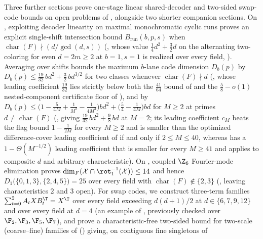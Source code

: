 Three further sections prove one-stage linear shared-decoder and two-sided swap-code bounds on open
problems of \cite{SeventeenthPaper2026}, alongside two shorter companion sections. On
\cite[Problem~9.1(a)]{SeventeenthPaper2026}, exploiting decoder linearity on maximal monochromatic
cyclic runs proves an explicit single-shift intersection bound $B_{\mathrm{run}}(b,p,s)$ when
$\operatorname{char}(F) \nmid (d/\gcd(d,s))$ (, whose value
$\frac{1}{4}d^2 + \frac{3}{2}d$ on the alternating two-coloring for even $d = 2m \ge 2$ at
$b = 1, s = 1$ is realized over every field, ). Averaging over shifts bounds
the maximum $b$-lane code dimension $D_b(p)$ by
$D_b(p) \le \frac{19}{32}\,bd^2 + \frac{3}{2}\,bd^{3/2}$ for two classes whenever
$\operatorname{char}(F) \nmid d$ (, whose leading coefficient $\frac{19}{32}$
lies strictly below both the $\frac{41}{64}$ bound of \cite[Theorem~3.4]{SharedDecoders2026} and the
$\frac{5}{8} - o(1)$ nested-component certificate floor of \cite[Theorem~C.6]{SharedDecoders2026}),
and by
$D_b(p) \le \bigl(1 - \frac{5}{4M} + \frac{1}{M^2} - \frac{1}{4M^3}\bigr)bd^2 +
\bigl(\frac{5}{4} - \frac{1}{4M}\bigr)bd$ for $M \ge 2$ at primes $d \ne \operatorname{char}(F)$
(, giving $\frac{19}{32}\,bd^2 + \frac{9}{8}\,bd$ at $M = 2$; its leading
coefficient $c_M$ beats the flag bound $1 - \frac{1}{2M}$ for every $M \ge 2$ and is smaller than the
optimized difference-cover leading coefficient of \cite[Theorem~3.5]{SharedDecoders2026} if and only
if $2 \le M \le 40$, whereas \cite[Theorem~3.5]{SharedDecoders2026} has a $1 - \Theta(M^{-1/2})$
leading coefficient that is smaller for every $M \ge 41$ and applies to composite $d$ and arbitrary
characteristic). On \cite[Problem~9.1(b)]{SeventeenthPaper2026}, coupled $\Z_6$ Fourier-mode
elimination proves $\dim_F(\mathcal{X} \cap \rot_1^{-1}(\mathcal{X})) \le 14$ and hence
$D_1\bigl(\{0,1,3\},\{2,4,5\}\bigr) = 25$ over every field with
$\operatorname{char}(F) \notin \{2, 3\}$ (, leaving characteristics $2$
and $3$ open). For swap codes, we construct three-term families $\sum_{t=0}^2 A_t X B_t^{\T} = X^{\T}$
over every field exceeding $d(d+1)/2$ at $d \in \{6, 7, 9, 12\}$ and over every field at $d = 4$
(an example of \cite[Remark~5.6]{SeventeenthPaper2026}, previously checked over
$\F_2, \F_3, \F_5, \F_7$), and prove a characteristic-free two-sided bound for two-scale
(coarse--fine) families of \cite[Problem~9.3]{SeventeenthPaper2026}
() giving, on contiguous fine singletons of
